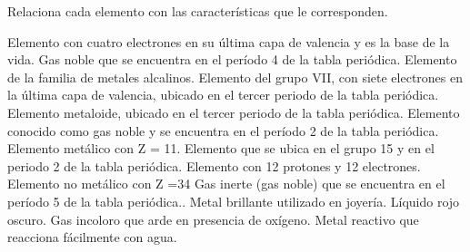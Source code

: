 \question[10] Relaciona cada elemento con las características que le
corresponden.

\begin{minipage}{0.6\textwidth}
    \begin{choices}
        \large
        \choice Elemento con cuatro electrones en su última capa de
        valencia y es la base de la vida.
        \choice Gas noble que se encuentra en el período 4 de la tabla
        periódica.
        \choice Elemento de la familia de metales alcalinos.
        \choice Elemento del grupo VII, con siete electrones en la
        última capa
        de valencia, ubicado en el tercer periodo de la tabla
        periódica.
        \choice Elemento metaloide, ubicado en el tercer periodo de la
        tabla
        periódica.
        \choice Elemento conocido como gas noble y se encuentra en el
        período 2 de la tabla periódica.
        \choice Elemento metálico con Z = 11.
        \choice Elemento que se ubica en el grupo 15 y en el periodo 2
        de la
        tabla periódica.
        \choice Elemento con 12 protones y 12 electrones.
        \choice Elemento no metálico con Z =34
        \choice Gas inerte (gas noble) que se encuentra en el período 5
        de la tabla periódica..
        \choice Metal brillante utilizado en joyería.
        \choice Líquido rojo oscuro.
        \choice Gas incoloro que arde en presencia de oxígeno.
        \choice Metal reactivo que reacciona fácilmente con agua.
    \end{choices}
\end{minipage}\hfill
